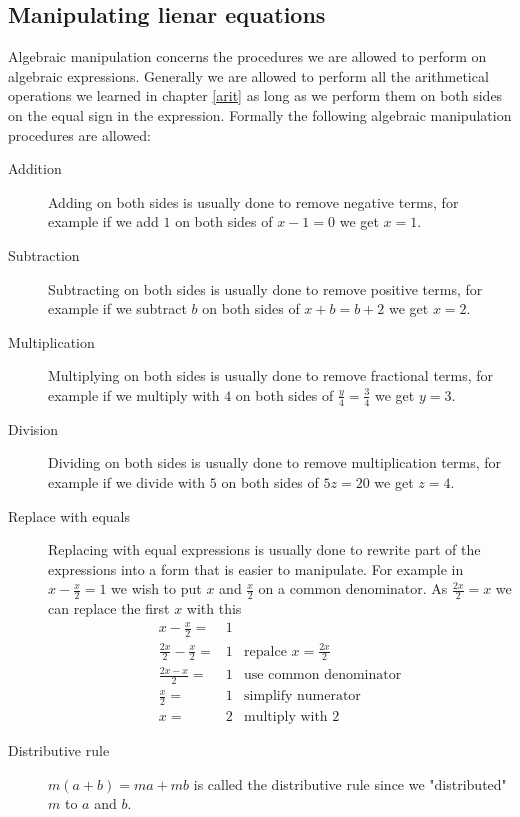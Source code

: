 \subsection{Manipulating lienar equations}
Algebraic manipulation concerns the procedures we are allowed to perform
on algebraic expressions. Generally we are allowed to perform all the
arithmetical operations we learned in chapter \ref{arit} as long as we
perform them on both sides on the equal sign in the expression. Formally
the following algebraic manipulation procedures are allowed:
\begin{description}
\item [Addition] Adding on both sides is usually done to remove negative
terms, for example if we add $1$ on both sides of $x - 1 = 0$ we get
$x = 1$.
\item [Subtraction] Subtracting on both sides is usually done to remove
positive terms, for example if we subtract $b$ on both sides of
$x + b = b + 2$ we get $x = 2$.
\item [Multiplication] Multiplying on both sides is usually done to
remove fractional terms, for example if we multiply with $4$ on both
sides of $\frac{y}{4} = \frac{3}{4}$ we get $y = 3$.
\item [Division] Dividing on both sides is usually done to remove
multiplication terms, for example if we divide with $5$ on both sides of
$5z = 20$ we get $z = 4$.
\item [Replace with equals] Replacing with equal expressions is usually
done to rewrite part of the expressions into a form that is easier to
manipulate. For example in $x - \frac{x}{2} = 1$ we wish to put $x$ and
$\frac{x}{2}$ on a common denominator. As $\frac{2x}{2} = x$ we can
replace the first $x$ with this
\begin{align*}
x - \frac{x}{2}            =& 1 &                                     \\
\frac{2x}{2} - \frac{x}{2} =& 1 & \textrm{repalce $x = \frac{2x}{2}$} \\
\frac{2x - x}{2}           =& 1 & \textrm{use common denominator}     \\
\frac{x}{2}                =& 1 & \textrm{simplify numerator}         \\
x                          =& 2 & \textrm{multiply with $2$}
\end{align*}
\item [Distributive rule] $m(a + b) = ma + mb$ is called the distributive
rule since we "distributed" $m$ to $a$ and $b$.
\end{description}

